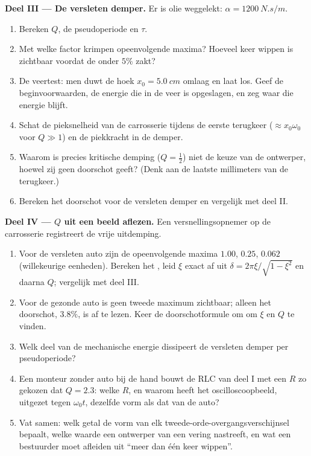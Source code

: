 \begin{problem}
\medskip
\noindent\textbf{Deel III --- De versleten demper.}
Er is olie weggelekt: $\alpha = \qty{1200}{N.s/m}$.
\begin{enumerate}[resume]
  \item Bereken $Q$, de pseudoperiode en $\tau$.
  \item Met welke factor krimpen opeenvolgende maxima? Hoeveel keer wippen
        is zichtbaar voordat de  onder $5\%$ zakt?
  \item De veertest: men duwt de hoek $x_0 =
        \qty{5.0}{cm}$ omlaag en laat los. Geef de beginvoorwaarden, de
        energie die in de veer is opgeslagen, en zeg waar die energie blijft.
  \item Schat de pieksnelheid van de carrosserie tijdens de eerste
        terugkeer ($\approx x_0\omega_0$ voor $Q \gg 1$) en de piekkracht in
        de demper.
  \item Waarom is precies kritische demping ($Q = \tfrac12$) niet de
        keuze van de ontwerper, hoewel zij geen doorschot geeft? (Denk aan
        de laatste millimeters van de terugkeer.)
  \item Bereken het doorschot voor de versleten demper en vergelijk met
        deel II.
\end{enumerate}

\medskip
\noindent\textbf{Deel IV --- $Q$ uit een beeld aflezen.}
Een versnellingsopnemer op de carrosserie registreert de vrije uitdemping.
\begin{enumerate}[resume]
  \item Voor de versleten auto zijn de opeenvolgende maxima $1.00$, $0.25$, $0.062$
        (willekeurige eenheden). Bereken het , leid
        $\xi$ exact af uit $\delta = 2\pi\xi/\sqrt{1 - \xi^2}$ en daarna $Q$;
        vergelijk met deel III.
  \item Voor de gezonde auto is geen tweede maximum zichtbaar; alleen het
        doorschot, $3.8\%$, is af te lezen. Keer de doorschotformule om om
        $\xi$ en $Q$ te vinden.
  \item Welk deel van de mechanische energie dissipeert de versleten demper
        per pseudoperiode?
  \item Een monteur zonder auto bij de hand bouwt de RLC van deel I
        met een $R$ zo gekozen dat $Q = 2.3$: welke $R$, en waarom heeft het
        oscilloscoopbeeld, uitgezet tegen $\omega_0 t$, dezelfde vorm
        als dat van de auto?
  \item Vat samen: welk  getal de vorm van elk
        tweede-orde-overgangsverschijnsel bepaalt, welke waarde een ontwerper van
        een vering nastreeft, en wat een bestuurder moet afleiden uit ``meer dan
        één keer wippen''.
\end{enumerate}
\end{problem}
